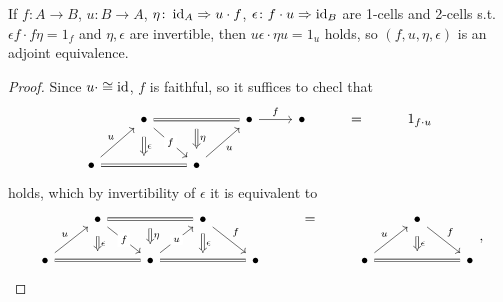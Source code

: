 \documentclass[a4paper,11pt,oneside,openany]{scrbook}
\begin{document}
\begin{lemma}
    If $f\colon A\rightarrow B$, $u\colon B\rightarrow A$,
    $\eta\colon\operatorname{id}_A\Rightarrow u\cdot f$, $\epsilon\colon f\cdot
    u\Rightarrow\operatorname{id}_B$ are 1-cells and 2-cells s.t.\ $\epsilon f\cdot f\eta=1_f$
    and $\eta,\epsilon$ are invertible, then $u\epsilon\cdot\eta u=1_u$ holds,
    so $(f,u,\eta,\epsilon)$ is an adjoint equivalence.
\end{lemma}
\begin{proof}
    Since $u\cdot\cong\operatorname{id}$, $f$ is faithful, so it suffices to checl that
    \[\begin{tikzcd}
        & \bullet && \bullet & \bullet & {=} & {1_{f\cdot u}} \\
        \bullet && \bullet
        \arrow[""{name=0, anchor=center, inner sep=0}, Rightarrow, no head, from=1-2, to=1-4]
        \arrow["f"{description}, from=1-2, to=2-3]
        \arrow["u"', from=2-3, to=1-4]
        \arrow["f", from=1-4, to=1-5]
        \arrow[""{name=1, anchor=center, inner sep=0}, Rightarrow, no head, from=2-1, to=2-3]
        \arrow["u", from=2-1, to=1-2]
        \arrow["\eta", shorten <=6pt, shorten >=6pt, Rightarrow, from=0, to=2-3]
        \arrow["\epsilon", shorten <=6pt, shorten >=6pt, Rightarrow, from=1-2, to=1]
    \end{tikzcd}\]
    holds, which by invertibility of $\epsilon$ it is equivalent to
    \[\begin{tikzcd}
        & \bullet && \bullet && {=} && \bullet \\
        \bullet && \bullet & {} & \bullet && \bullet && \bullet
        \arrow[""{name=0, anchor=center, inner sep=0}, Rightarrow, no head, from=1-2, to=1-4]
        \arrow["f"{description}, from=1-2, to=2-3]
        \arrow["u"{description}, from=2-3, to=1-4]
        \arrow[""{name=1, anchor=center, inner sep=0}, Rightarrow, no head, from=2-1, to=2-3]
        \arrow["u", from=2-1, to=1-2]
        \arrow["f", from=1-4, to=2-5]
        \arrow[Rightarrow, no head, from=2-3, to=2-5]
        \arrow["\epsilon", shorten <=4pt, shorten >=4pt, Rightarrow, from=1-4, to=2-4]
        \arrow["u", from=2-7, to=1-8]
        \arrow["f", from=1-8, to=2-9]
        \arrow[""{name=2, anchor=center, inner sep=0}, Rightarrow, no head, from=2-7, to=2-9]
        \arrow["\eta", shorten <=6pt, shorten >=6pt, Rightarrow, from=0, to=2-3]
        \arrow["\epsilon", shorten <=6pt, shorten >=6pt, Rightarrow, from=1-2, to=1]
        \arrow["\epsilon", shorten <=6pt, shorten >=6pt, Rightarrow, from=1-8, to=2]
    \end{tikzcd},\]

\end{proof}
\end{document}
